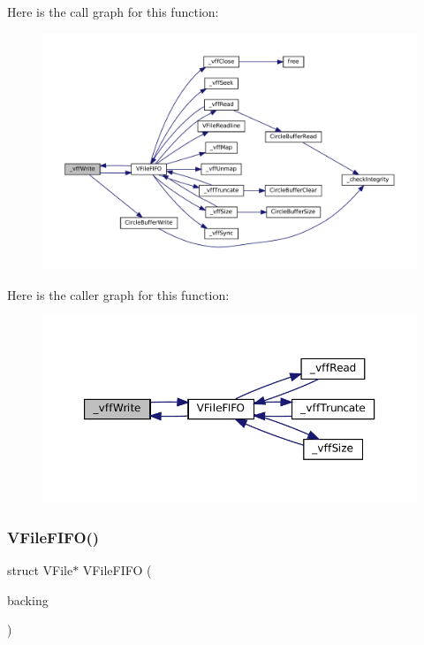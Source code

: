 Here is the call graph for this function\+:
\nopagebreak
\begin{figure}[H]
\begin{center}
\leavevmode
\includegraphics[width=350pt]{vfs-fifo_8c_a9edb7182cfa99285402b489ff82d31f5_cgraph}
\end{center}
\end{figure}
Here is the caller graph for this function\+:
\nopagebreak
\begin{figure}[H]
\begin{center}
\leavevmode
\includegraphics[width=350pt]{vfs-fifo_8c_a9edb7182cfa99285402b489ff82d31f5_icgraph}
\end{center}
\end{figure}
\mbox{\label{vfs-fifo_8c_af4228c6570572950e85b27b5315eec75}} 
\subsubsection{\texorpdfstring{V\+File\+F\+I\+F\+O()}{VFileFIFO()}}
{\footnotesize\ttfamily struct V\+File$\ast$ V\+File\+F\+I\+FO (\begin{DoxyParamCaption}\item[{struct Circle\+Buffer $\ast$}]{backing }\end{DoxyParamCaption})}

